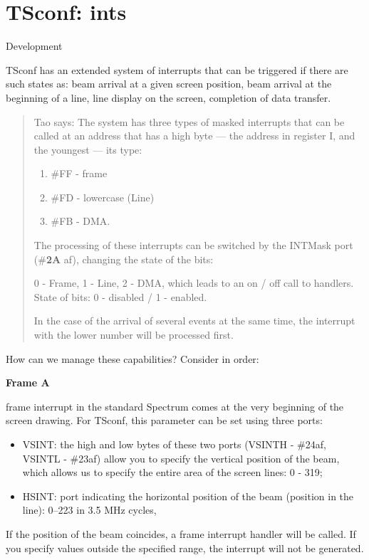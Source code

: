 \documentclass{article}
\begin{document}
\section*{TSconf: ints}

Development

TSconf has an extended system of interrupts that can be triggered if
there are such states as: beam arrival at a given screen position,
beam arrival at the beginning of a line, line display on the screen,
completion of data transfer.

\begin{quotation}
  Tao says: The system has three types of masked interrupts that can
  be called at an address that has a high byte — the address in
  register I, and the youngest — its type:

  \begin{enumerate}
  \item \#FF - frame
  \item \#FD - lowercase (Line)
  \item \#FB - DMA.
  \end{enumerate}
  The processing of these interrupts can be switched by the INTMask
  port (\#\textbf{2A} af), changing the state of the bits:

  0 - Frame, 1 - Line, 2 - DMA, which leads to an on / off call to
  handlers. State of bits: 0 - disabled / 1 - enabled.

  In the case of the arrival of several events at the same time, the
  interrupt with the lower number will be processed first.
\end{quotation}

How can we manage these capabilities? Consider in order:

\textbf{Frame A}

frame interrupt in the standard Spectrum comes at the very beginning
of the screen drawing. For TSconf, this parameter can be set using
three ports:

\begin{itemize}
\item VSINT: the high and low bytes of these two ports (VSINTH -
  \#24af, VSINTL - \#23af) allow you to specify the vertical position
  of the beam, which allows us to specify the entire area of ​​the
  screen lines: 0 - 319;
\item HSINT: port indicating the horizontal position of the beam
  (position in the line): 0–223 in 3.5 MHz cycles,
\end{itemize}
If the position of the beam coincides, a frame interrupt handler will
be called. If you specify values ​​outside the specified range, the
interrupt will not be generated.
\end{document}
